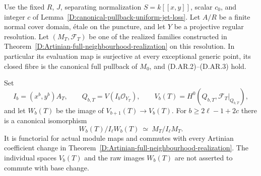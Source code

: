 \begin{corollary}
\label{D:Artinian-canonical-two-level-jets}
Use the fixed $R$, $J$, separating normalization
$S=k[[x,y]]$, scalar $c_0$, and integer $c$ of
Lemma~\ref{D:canonical-pullback-uniform-jet-loss}.
Let $A/R$ be a finite normal cover domain, étale on the
puncture, and let $Y$ be a projective regular resolution.
Let $(M_T,\mathcal F_T)$ be one of the realized families
constructed in
Theorem~\ref{D:Artinian-full-neighbourhood-realization}
on this resolution. In particular its evaluation map is
surjective at every exceptional generic point, its closed
fibre is the canonical full pullback of $M_0$, and
(D.AR.2)--(D.AR.3) hold.

Set
\[
 I_b=(x^b,y^b)A_T,\qquad
 Q_{b,T}=V(I_b\mathcal O_{Y_T}),\qquad
 V_b(T)=H^0(Q_{b,T},\mathcal F_T|_{Q_{b,T}}),
\]
and let $W_b(T)$ be the image of $V_{b+1}(T)\to V_b(T)$.
For $b\ge2\ell-1+2c$ there is a canonical isomorphism
\[
             W_b(T)/I_\ell W_b(T)\ \simeq\
                         M_T/I_\ell M_T.              \tag{D.AR.12}
\]
It is functorial for actual module maps and commutes with
every Artinian coefficient change in
Theorem~\ref{D:Artinian-full-neighbourhood-realization}.
The individual spaces $V_b(T)$ and the raw images $W_b(T)$
are not asserted to commute with base change.
\end{corollary}

